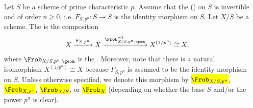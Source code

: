 \begin{definition} \label{definition:frobenius_endomorphism_on_a_scheme_over_a_scheme_with_invertible_finite_order_absolute_frobenius_morphism}
    Let $S$ be a scheme of prime characteristic $p$. Assume that the  () on $S$ is invertible and of order $n \geq 0$, i.e. $F_{S,p^n} : S \to S$ is the identity morphism on $S$. Let $X/S$ be a scheme. The  is the composition
    $$X \xrightarrow{F_{X,p^n}} X \xrightarrow{\Frob_{X/S, p^n, \geom}^{-1}} X^{(1/p^n)} \cong X,$$
    where $\Frob_{X/S, p^n, \geom}$ is the . Moreover, note that there is a natural isomorphism $X^{(1/p^n)} \cong X$ because $F_{S, p^n}$ is assumed to be the identity morphism on $S$. Unless otherwise specified, we denote this morphism by \hl{$\Frob_{X/S,p^n}$}, \hl{$\Frob_{X,p^n}$}, \hl{$\Frob_{X/S}$}, or \hl{$\Frob_{X}$} (depending on whether the base $S$ and/or the power $p^n$ is clear).
\end{definition}